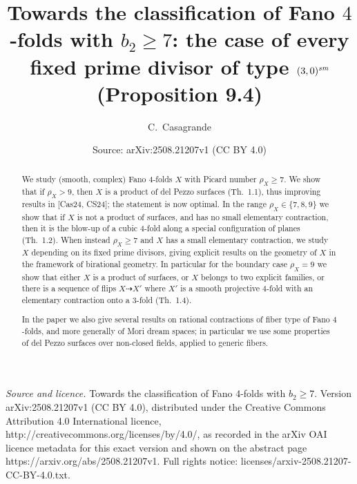 \documentclass[10pt,a4paper]{amsart}
\title[Fano $4$-folds with $b_2\geq 7$]{Towards the classification of Fano $4$-folds with $b_2\geq 7$: the case of every fixed prime divisor of type $(3,0)^{\text{\it sm}}$ (Proposition 9.4)}
\author{C.~Casagrande}
\date{Source: arXiv:2508.21207v1 (CC BY 4.0)}
\theoremstyle{definition}
\numberwithin{figure}{section}
\numberwithin{table}{section}
\begin{document}
\begin{abstract}
  We study (smooth, complex) Fano $4$-folds $X$ with Picard number $\rho_X\geq 7$. We show that if $\rho_X>9$, then $X$ is a product of del Pezzo surfaces (Th.~1.1), thus improving results in [Cas24, CS24]; the statement is now optimal.  In the range $\rho_X\in\{7,8,9\}$ we show that if $X$ is not a product of surfaces, and has no small elementary contraction, then it is the blow-up of a cubic $4$-fold along a special configuration of planes
  (Th.~1.2). When instead $\rho_X\geq 7$ and $X$ has a small elementary contraction, we study $X$ depending on its fixed prime divisors, giving explicit results on the geometry of $X$ in the framework of birational geometry.
  In particular for the boundary case $\rho_X=9$ we show that either $X$ is a product of surfaces, or $X$ belongs to two explicit families, or there is a sequence of flips $X\dasharrow X'$ where $X'$ is a smooth projective $4$-fold with an elementary contraction onto a $3$-fold (Th.~1.4).

  In the paper we also give several results on rational contractions of fiber type of Fano $4$-folds, and more generally of Mori dream spaces; in particular we use some properties of del Pezzo surfaces over non-closed fields, applied to generic fibers.
\end{abstract}
\maketitle
\noindent\emph{Source and licence.} Towards the classification of Fano $4$-folds with $b_2\geq 7$. Version arXiv:2508.21207v1 (CC BY 4.0), distributed under the Creative Commons Attribution 4.0 International licence, http://creativecommons.org/licenses/by/4.0/, as recorded in the arXiv OAI licence metadata for this exact version and shown on the abstract page https://arxiv.org/abs/2508.21207v1. Full rights notice: licenses/arxiv-2508.21207-CC-BY-4.0.txt.\par\smallskip
\end{document}

